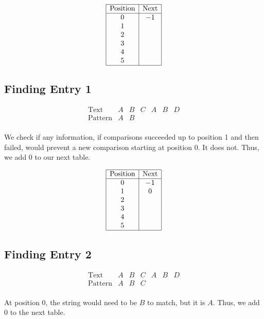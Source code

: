 \documentclass[a4paper,12pt]{article}
\begin{document}
\[
\begin{array}{|c|c|}
\hline
\text{Position} & \text{Next} \\
\hline
0 & -1 \\
1 &  \\
2 &  \\
3 &  \\
4 &  \\
5 &  \\
\hline
\end{array}
\]

\subsection*{Finding Entry 1}
\[
\begin{array}{c|c|c|c|c|c|c|}
\text{Text} & A & B & C & A & B & D \\
\hline
\text{Pattern} & A & B &   &   &   &   \\
\end{array}
\]

\begin{tcolorbox}[colback=blue!5, colframe=blue!75!black, title=Explanation]
We check if any information, if comparisons succeeded up to position 1 and then failed, would prevent a new comparison starting at position 0. It does not. Thus, we add \(0\) to our next table.
\end{tcolorbox}

\[
\begin{array}{|c|c|}
\hline
\text{Position} & \text{Next} \\
\hline
0 & -1 \\
1 & 0 \\
2 &  \\
3 &  \\
4 &  \\
5 &  \\
\hline
\end{array}
\]

\subsection*{Finding Entry 2}
\[
\begin{array}{c|c|c|c|c|c|c|}
\text{Text} & A & B & C & A & B & D \\
\hline
\text{Pattern} & A & B & C &   &   &   \\
\end{array}
\]

\begin{tcolorbox}[colback=blue!5, colframe=blue!75!black, title=Explanation]
At position \(0\), the string would need to be \(B\) to match, but it is \(A\). Thus, we add \(0\) to the next table.
\end{tcolorbox}
\end{document}
